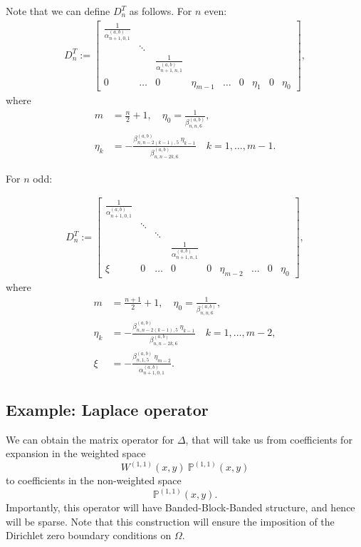 \documentclass[11pt, oneside]{article}   	%
\newcommand{\bigP}{\mathbb{P}}
\newcommand{\alphaab}{\alpha^{(a,b)}}
\newcommand{\betaab}{\beta^{(a,b)}}
\newcommand{\Dnt}{D^T_n}
\newcommand{\Wii}{W^{(1,1)}}
\begin{document}
Note that we can define \(\Dnt\) as follows. For \(n\) even:
\begin{align}
\Dnt := \begin{bmatrix}
		\frac{1}{\alphaab_{n+1,0,1}} & & &  \\
		& \ddots & & & \\
		& & \frac{1}{\alphaab_{n+1,n,1}} & \\
		0 & \hdots & 0 & \eta_{m-1} & \hdots & 0 & \eta_1 & 0 & \eta_0
	    \end{bmatrix},
\end{align}
where
\begin{align}
m &= \frac{n}{2} + 1, \quad \eta_0 = \frac{1}{\betaab_{n,n,6}}, \nonumber \\
\eta_k &= -\frac{\betaab_{n,n-2(k-1),5} \: \eta_{k-1}}{\betaab_{n,n-2k,6}} \quad k = 1,\dots,m-1.
\end{align}

For \(n\) odd:

\begin{align}
\Dnt := \begin{bmatrix}
		\frac{1}{\alphaab_{n+1,0,1}} & &  \\
		& \ddots & & &  \\
		& & \ddots & & \\
		& & & \frac{1}{\alphaab_{n+1,n,1}} & \\
		\xi & 0 & \hdots & 0 & 0 & \eta_{m-2} & \hdots & 0 & \eta_0
	    \end{bmatrix},
\end{align}
 where
\begin{align}
m &= \frac{n+1}{2} + 1, \quad \eta_0 = \frac{1}{\betaab_{n,n,6}}, \nonumber \\
\eta_k &= -\frac{\betaab_{n,n-2(k-1),5} \: \eta_{k-1}}{\betaab_{n,n-2k,6}} \quad k = 1,\dots,m-2, \\
\xi &= -\frac{\betaab_{n,1,5} \: \eta_{m-2}}{\alphaab_{n+1,0,1}}. \nonumber
\end{align}

\subsection{Example: Laplace operator}

We can obtain the matrix operator for \(\Delta\), that will take us from coefficients for expansion in the weighted space
\[
\Wii(x,y) \: \bigP^{(1,1)}(x,y)
\]
to coefficients in the non-weighted space
\[
\bigP^{(1,1)}(x,y).
\]
Importantly, this operator will have Banded-Block-Banded structure, and hence will be sparse. Note that this construction will ensure the imposition of the Dirichlet zero boundary conditions on $\Omega$.
\end{document}
